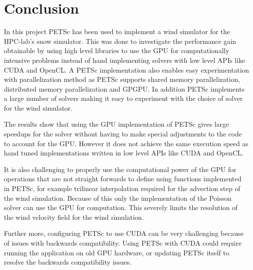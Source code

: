 \chapter{Conclusion}

In this project PETSc has been used to implement a wind simulator for the HPC-lab's
snow simulator. This was done to investigate the performance gain obtainable by
using high level libraries to use the GPU for computationally intensive problems
instead of hand implementing solvers with low level APIs like CUDA and OpenCL.
A PETSc implementation also enables easy experimentation with parallelization
method as PETSc supports shared memory parallelization, distributed memory
parallelization and GPGPU. In addition PETSc implements a large number of solvers
making it easy to experiment with the choice of solver for the wind simulator.

The results show that using the GPU implementation of PETSc gives large speedups
for the solver without having to make special adjustments to the code to account
for the GPU. However it does not achieve the same execution speed as hand tuned
implementations written in low level APIs like CUDA and OpenCL.

It is also challenging to properly use the computational power of the GPU
for operations that are not straight forwards to define using functions implemented
in PETSc, for example trilinear interpolation required for the advection step of
the wind simulation. Because of this only the implementation of the Poisson
solver can use the GPU for computation. This severely limits the resolution of
the wind velocity field for the wind simulation.

Further more, configuring PETSc to use CUDA can be very challenging because of
issues with backwards compatibility. Using PETSc with CUDA could require
running the application on old GPU hardware, or updating PETSc itself to resolve
the backwards compatibility issues.
